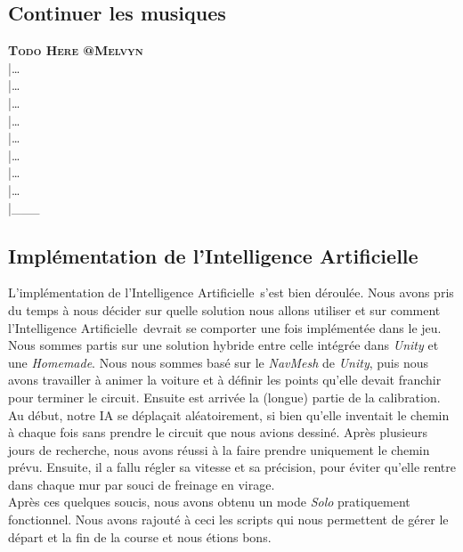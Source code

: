 \documentclass[12pt,a4paper]{article}
\newcommand{\AI}{Intelligence Artificielle}
\begin{document}
        \subsection{Continuer les musiques}
            \textbf{\textsc{Todo Here @Melvyn}}\\
            |\dots\\|\dots\\|\dots\\|\dots\\|\dots\\|\dots\\|\dots\\|\dots\\|\_\_\_\\


        \subsection{Implémentation de l'\AI}
            L'implémentation de l'\AI\, s'est bien déroulée. Nous avons pris du temps
            à nous décider sur quelle solution nous allons utiliser et sur comment
            l'\AI\, devrait se comporter une fois implémentée dans le jeu. Nous sommes partis sur une
            solution hybride entre celle intégrée dans \textsl{Unity} et une \textsl{Homemade}.
            Nous nous sommes basé sur le \textsl{NavMesh} de \textsl{Unity}, puis nous avons
            travailler à animer la voiture et à définir les points qu'elle devait franchir pour
            terminer le circuit.  Ensuite est arrivée
            la (longue) partie de la calibration. Au début, notre IA se déplaçait aléatoirement,
            si bien qu'elle inventait le chemin à chaque fois sans prendre le circuit que nous
            avions dessiné. Après plusieurs jours de recherche, nous avons réussi à la faire
            prendre uniquement le chemin prévu. Ensuite, il a fallu régler sa vitesse et sa
            précision, pour éviter qu'elle rentre dans chaque mur par souci de freinage en virage.\\
            Après ces quelques soucis, nous avons obtenu un mode \textsl{Solo} pratiquement
            fonctionnel. Nous avons rajouté à ceci les scripts qui nous permettent de gérer
            le départ et la fin de la course et nous étions bons.\\
\end{document}
